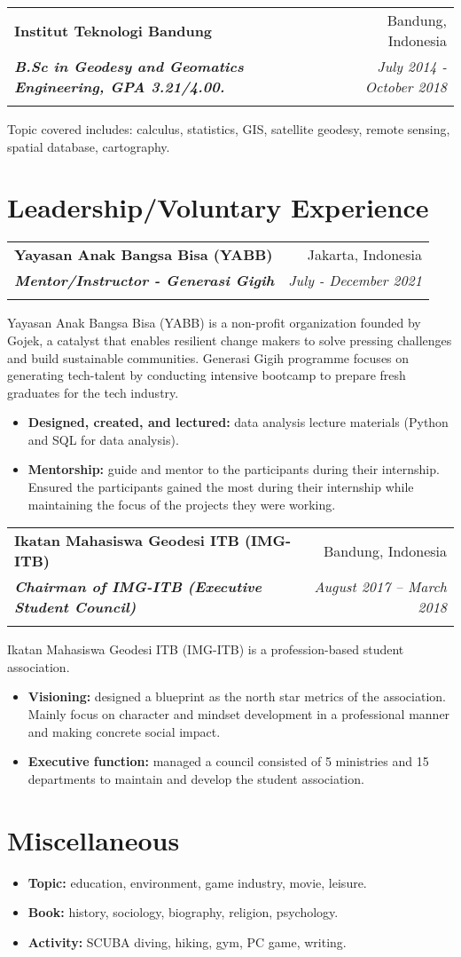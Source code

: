 \documentclass[a4paper, 11pt]{article}
\makeatletter
\newcommand{\resumeItem}[2]{
    \item\small{
        \textbf{#1}{#2 \vspace{-2pt}}
    }
}
\newcommand{\resumeSubheading}[4]{
    \vspace{-1pt}
    \begin{tabular*}{\textwidth}{l@{\extracolsep{\fill}}r}
        \color{lightblue}\textbf{#1} & #2 \\
        \textbf{\textit{\small#3}} & \textit{\small #4} \\
        \textnormal{}\vspace{-5pt}
    \end{tabular*}\vspace{-5pt}
}
\newcommand{\resumeItemListStart}{\begin{itemize}[leftmargin=*]\setlength\itemsep{0em}\vspace{-1pt}}
\newcommand{\resumeItemListEnd}{\end{itemize}\vspace{-5pt}}
\makeatother
\begin{document}
    \vspace{5pt}
    \resumeSubheading
    {Institut Teknologi Bandung}
    {Bandung, Indonesia}
    {B.Sc in Geodesy and Geomatics Engineering, GPA 3.21/4.00.}
    {July 2014 - October 2018}
    {Topic covered includes: calculus, statistics, GIS, satellite geodesy, 
    remote sensing, spatial database, cartography.}

    \vspace{-5pt}
    \section{Leadership/Voluntary Experience}

    \resumeSubheading
    {Yayasan Anak Bangsa Bisa (YABB)}
    {Jakarta, Indonesia}
    {Mentor/Instructor - Generasi Gigih}
    {July - December 2021}
    {Yayasan Anak Bangsa Bisa (YABB) is a non-profit organization founded by Gojek, a
    catalyst that enables resilient change makers to solve pressing challenges and build
    sustainable communities. Generasi Gigih programme focuses on generating tech-talent
    by conducting intensive bootcamp to prepare fresh graduates for the tech industry.}
    \vspace{-5pt}
    \resumeItemListStart
    \resumeItem{Designed, created, and lectured:}{ data analysis lecture materials (Python and SQL
    for data analysis).}
    \resumeItem{Mentorship:}{ guide and mentor to the participants during their
    internship. Ensured the participants gained the most during their
    internship while maintaining the focus of the projects they were working.}
    \resumeItemListEnd

    \vspace{5pt}
    \resumeSubheading
    {Ikatan Mahasiswa Geodesi ITB (IMG-ITB)}
    {Bandung, Indonesia}
    {Chairman of IMG-ITB (Executive Student Council)}
    {August 2017 – March 2018}
    {Ikatan Mahasiswa Geodesi ITB (IMG-ITB) is a profession-based student association.}
    \vspace{-5pt}
    \resumeItemListStart
    \resumeItem{Visioning:}{ designed a blueprint as the north star metrics of the
    association. Mainly focus on character and mindset development in a
    professional manner and making concrete social impact.}
    \resumeItem{Executive function:}{ managed a council consisted of 5 ministries and 15
    departments to maintain and develop the student association.}
    \resumeItemListEnd

    \vspace{-20pt}
    \section{Miscellaneous}

    \resumeItemListStart
    \resumeItem{Topic:}{ education, environment, game industry, movie, leisure.}
    \resumeItem{Book:}{ history, sociology, biography, religion, psychology.}
    \resumeItem{Activity:}{ SCUBA diving, hiking, gym, PC game, writing.}
    \resumeItemListEnd
\end{document}
